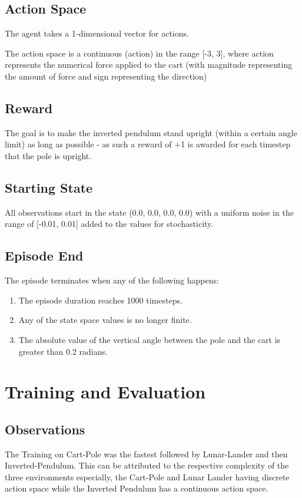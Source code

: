 \documentclass{article} %
\begin{document}
\subsection{Action Space}
The agent takes a 1-dimensional vector for actions.

The action space is a continuous (action) in the range [-3, 3], where action represents the numerical force applied to the cart (with magnitude representing the amount of force and sign representing the direction)

\subsection{Reward}
The goal is to make the inverted pendulum stand upright (within a certain angle limit) as long as possible - as such a reward of +1 is awarded for each timestep that the pole is upright.

\subsection{Starting State}
All observations start in the state (0.0, 0.0, 0.0, 0.0) with a uniform noise in the range of [-0.01, 0.01] added to the values for stochasticity.

\subsection{Episode End}
The episode terminates when any of the following happens: \begin{enumerate}
\item The episode duration reaches 1000 timesteps.
\item Any of the state space values is no longer finite.
\item The absolute value of the vertical angle between the pole and the cart is greater than 0.2 radians.
\end{enumerate}

\section{Training and Evaluation}
\subsection{Observations}
The Training on Cart-Pole was the fastest followed by Lunar-Lander and then Inverted-Pendulum. This can be attributed to the respective complexity of the three environments especially, the Cart-Pole and Lunar Lander having discrete action space while the Inverted Pendulum has a continuous action space.
\end{document}
